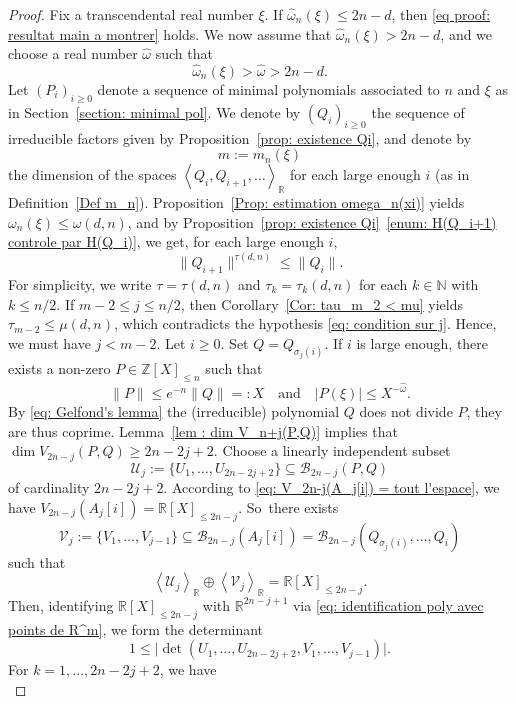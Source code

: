 \documentclass[JEP,XML,SOM,Unicode,NoFloatCountersInSection,published]{cedram}
\newcommand\bN{\mathbb{N}}
\newcommand\bR{\mathbb{R}}
\newcommand\bZ{\mathbb{Z}}
\newcommand\cB{\mathcal{B}}
\newcommand\cU{\mathcal{U}}
\newcommand\cV{\mathcal{V}}
\newcommand\homega{\widehat{\omega}}\newcommand\HH{\mathcal{H}}
\newcommand{\normH}[1]{\|#1\|}
\newcommand{\Vect}[2][]{\left\la #2\right\ra_{#1}}
\let\subset \subseteq
\let\la\langle
\let\ra\rangle
\newcommand\AND{\quad\text{and}\quad}
\theoremstyle{definition}
\theoremstyle{plain}
\begin{document}
\begin{proof}
Fix a transcendental real number $\xi$. If $\homega_n(\xi)\leq 2n-d$, then \eqref{eq proof: resultat main a montrer} holds. We now assume that $\homega_n(\xi) > 2n-d$, and we choose a real number $\homega$ such that
\[
\homega_n(\xi) > \homega > 2n-d.
\]
Let $(P_i)_{i\geq 0}$ denote a sequence of minimal polynomials associated to $n$ and $\xi$ as in Section~\ref{section: minimal pol}. We denote by $(Q_i)_{i\geq 0}$ the sequence of irreducible factors given by Proposition~\ref{prop: existence Qi}, and denote by
\[
m:=m_n(\xi)
\]
the dimension of the spaces $\Vect[\bR]{Q_i,Q_{i+1},\dots}$ for each large enough $i$ (as in Definition~\ref{Def m_n}). Proposition~\ref{Prop: estimation omega_n(xi)} yields $\omega_n(\xi)\leq \omega(d,n)$, and by Proposition~\ref{prop: existence Qi}~\eqref{enum: H(Q_i+1) controle par H(Q_i)}, we get, for each large enough $i$,
\[
\normH{Q_{i+1}}^{\tau(d,n)} \leq \normH{Q_i}.
\]
For simplicity, we write $\tau=\tau(d,n)$ and $\tau_k=\tau_k(d,n)$ for each $k\in\bN$ with $k\leq n/2$. If $m-2 \le j\le n/2$, then Corollary~\ref{Cor: tau_m_2 < mu} yields $\tau_{m-2} \leq \mu(d,n)$, which contradicts the hypothesis \eqref{eq: condition sur j}. Hence, we must have $j<m-2$. Let $i\geq 0$. Set $Q = Q_{\sigma_j(i)}$. If $i$ is large enough, there exists a non-zero $P\in\bZ[X]_{\leq n}$ such that
\begin{equation*}
\normH{P} \leq e^{-n} \normH{Q}=: X \AND |P(\xi)| \leq X^{-\homega}.
\end{equation*}
By \eqref{eq: Gelfond's lemma} the (irreducible) polynomial $Q$ does not divide $P$, they are thus coprime. Lemma~\ref{lem : dim V_n+j(P,Q)} implies that $\dim V_{2n-j}(P,Q)\geq 2n-2j+2$. Choose a linearly independent subset
\[
\cU_j:=\{U_1,\dots,U_{2n-2j+2}\} \subset \cB_{2n-j}(P,Q)
\]
of cardinality $2n-2j+2$. According to \eqref{eq: V_2n-j(A_j[i]) = tout l'espace}, we have $V_{2n-j}(A_j[i]) = \bR[X]_{\leq 2n-j}$. So~there exists
\[
\cV_j:=\{V_1,\dots,V_{j-1}\} \subset \cB_{2n-j}(A_j[i]) = \cB_{2n-j}(Q_{\sigma_j(i)},\dots, Q_i)
\]
such that
\[
\Vect[\bR]{\cU_j} \oplus \Vect[\bR]{\cV_j} = \bR[X]_{\leq 2n-j}.
\]
Then, identifying $\bR[X]_{\leq 2n-j}$ with $\bR^{2n-j+1}$ via \eqref{eq: identification poly avec points de R^m}, we form the determinant
\begin{equation}
\label{eq proof: det à considérer}
1 \leq \big|\det(U_1,\dots,U_{2n-2j+2},V_1,\dots,V_{j-1}) \big|.
\end{equation}
For $k=1,\dots,2n-2j+2$, we have
\begin{equation*}

\end{equation*}
\end{proof}
\end{document}
